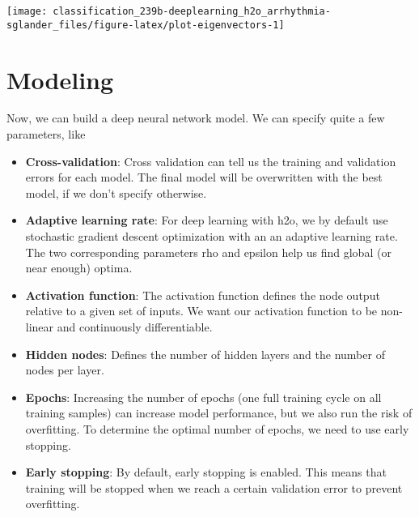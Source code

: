 \documentclass[]{book}
\newenvironment{Shaded}{\begin{snugshade}}{\end{snugshade}}
\newcommand{\DataTypeTok}[1]{\textcolor[rgb]{0.13,0.29,0.53}{#1}}
\newcommand{\FloatTok}[1]{\textcolor[rgb]{0.00,0.00,0.81}{#1}}
\newcommand{\KeywordTok}[1]{\textcolor[rgb]{0.13,0.29,0.53}{\textbf{#1}}}
\newcommand{\NormalTok}[1]{#1}
\newcommand{\OperatorTok}[1]{\textcolor[rgb]{0.81,0.36,0.00}{\textbf{#1}}}
\newcommand{\StringTok}[1]{\textcolor[rgb]{0.31,0.60,0.02}{#1}}
\begin{document}
\begin{Shaded}
\end{Shaded}

\begin{center}\texttt{[image: classification\_239b-deeplearning\_h2o\_arrhythmia-sglander\_files/figure-latex/plot-eigenvectors-1]} \end{center}

\hypertarget{modeling}{%
\section{Modeling}\label{modeling}}

Now, we can build a deep neural network model. We can specify quite a few parameters, like

\begin{itemize}
\item
  \textbf{Cross-validation}: Cross validation can tell us the training and validation errors for each model. The final model will be overwritten with the best model, if we don't specify otherwise.
\item
  \textbf{Adaptive learning rate}: For deep learning with h2o, we by default use stochastic gradient descent optimization with an an adaptive learning rate. The two corresponding parameters rho and epsilon help us find global (or near enough) optima.
\item
  \textbf{Activation function}: The activation function defines the node output relative to a given set of inputs. We want our activation function to be non-linear and continuously differentiable.
\item
  \textbf{Hidden nodes}: Defines the number of hidden layers and the number of nodes per layer.
\item
  \textbf{Epochs}: Increasing the number of epochs (one full training cycle on all training samples) can increase model performance, but we also run the risk of overfitting. To determine the optimal number of epochs, we need to use early stopping.
\item
  \textbf{Early stopping}: By default, early stopping is enabled. This means that training will be stopped when we reach a certain validation error to prevent overfitting.
\end{itemize}
\end{document}
